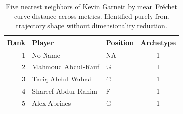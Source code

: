 \begin{table}[htbp]
  \centering\small
  \begin{tabular}{rllc}
    \toprule
    Rank & Player & Position & Archetype \\
    \midrule
    1 & No Name & NA & 1 \\
    2 & Mahmoud Abdul-Rauf & G & 1 \\
    3 & Tariq Abdul-Wahad & G & 1 \\
    4 & Shareef Abdur-Rahim & F & 1 \\
    5 & Alex Abrines & G & 1 \\
    \bottomrule
  \end{tabular}
  \caption{Five nearest neighbors of Kevin Garnett by mean Fr\'{e}chet curve distance across metrics. Identified purely from trajectory shape without dimensionality reduction.}
\end{table}


